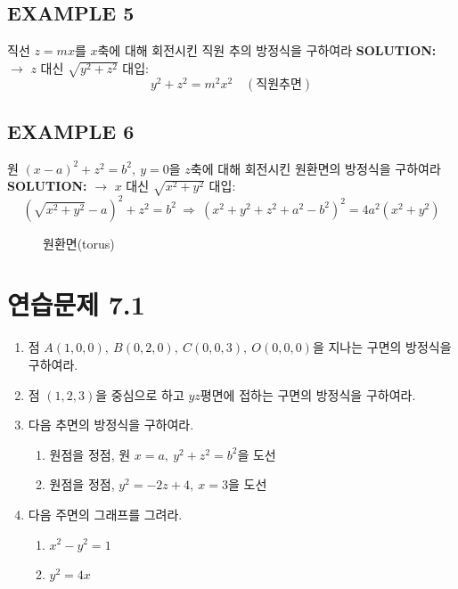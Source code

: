 \documentclass{article}
\theoremstyle{mystyle}
\begin{document}
\subsection*{EXAMPLE 5}
직선 \(z=mx\)를 \(x\)축에 대해 회전시킨 직원 추의 방정식을 구하여라
\textbf{SOLUTION:} $\to$ \(z\) 대신 \(\sqrt{y^2+z^2}\) 대입:
\[
y^2+z^2=m^2x^2 \quad(\text{직원추면})
\]
\subsection*{EXAMPLE 6}
원 \((x-a)^2+z^2=b^2,\ y=0\)을 \(z\)축에 대해 회전시킨 원환면의 방정식을 구하여라
\textbf{SOLUTION:} $\to$ \(x\) 대신 \(\sqrt{x^2+y^2}\) 대입:
\[
\left(\sqrt{x^2+y^2}-a\right)^2+z^2=b^2
\ \Longrightarrow\
(x^2+y^2+z^2+a^2-b^2)^2=4a^2(x^2+y^2)
\]

\begin{figure}[h]
\centering
{}
\caption{원환면(torus)}
\end{figure}
\section*{연습문제 7.1}
\begin{enumerate}
    \item 점 \(A(1,0,0),\ B(0,2,0),\ C(0,0,3),\ O(0,0,0)\)을 지나는 구면의 방정식을 구하여라.
    \item 점 \((1,2,3)\)을 중심으로 하고 \(yz\)평면에 접하는 구면의 방정식을 구하여라.
    \item 다음 추면의 방정식을 구하여라.
    \begin{enumerate}
        \item[(1)] 원점을 정점, 원 \(x=a,\ y^2+z^2=b^2\)을 도선
        \item[(2)] 원점을 정점, \(y^2=-2z+4,\ x=3\)을 도선
    \end{enumerate}
    \item 다음 주면의 그래프를 그려라.
    \begin{enumerate}
        \item[(1)] \(x^2-y^2=1\)
        \item[(2)] \(y^2=4x\)
    \end{enumerate}
\end{enumerate}
\end{document}
